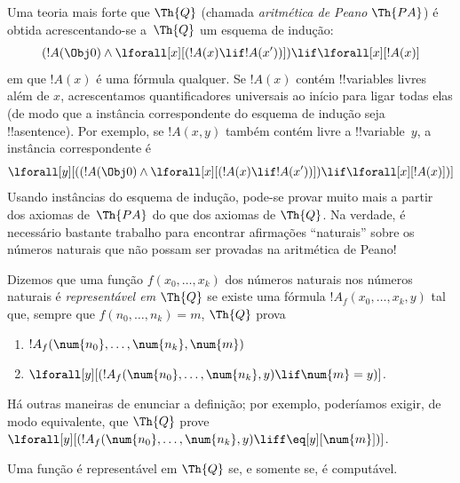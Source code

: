 \documentclass[../../../include/open-logic-section]{subfiles}
\begin{document}
Uma teoria mais forte que $\Th{Q}$ (chamada \emph{aritmética de Peano}
$\Th{PA}$) é obtida acrescentando-se a~$\Th{Q}$ um esquema de indução:
\[
(!A(\Obj 0) \land \lforall[x][(!A(x) \lif !A(x'))]) \lif \lforall[x][!A(x)]
\]
em que $!A(x)$ é uma fórmula qualquer. Se $!A(x)$ contém
!!{variable}s livres além de $x$, acrescentamos quantificadores
universais ao início para ligar todas elas (de modo que a instância
correspondente do esquema de indução seja !!a{sentence}). Por exemplo,
se $!A(x, y)$ também contém livre a !!{variable}~$y$, a instância
correspondente é
\[
\lforall[y][((!A(\Obj 0) \land \lforall[x][(!A(x) \lif !A(x'))]) \lif
  \lforall[x][!A(x)])]
\]
Usando instâncias do esquema de indução, pode-se provar muito mais a
partir dos axiomas de~$\Th{PA}$ do que dos axiomas de $\Th{Q}$. Na
verdade, é necessário bastante trabalho para encontrar afirmações
``naturais'' sobre os números naturais que não possam ser provadas na
aritmética de Peano!{}

\begin{defn}
  Dizemos que uma função $f(x_0,\ldots,x_k)$ dos números naturais nos
  números naturais é {\em representável em $\Th{Q}$} se existe uma
  fórmula $!A_f(x_0,\dots,x_k,y)$ tal que, sempre que
  $f(n_0,\dots,n_k) = m$, $\Th{Q}$ prova
\begin{enumerate}
\item{} $!A_f(\num{n_0}, \dots, \num{n_k}, \num{m})$
\item{} $\lforall[y][(!A_f(\num{n_0}, \dots,
\num{n_k}, y) \lif \num{m} = y)]$.
\end{enumerate}
\end{defn}

Há outras maneiras de enunciar a definição; por exemplo, poderíamos
exigir, de modo equivalente, que $\Th{Q}$ prove
$\lforall[y][(!A_f(\num{n_0}, \dots,
\num{n_k}, y) \liff \eq[y][\num{m}])]$.

\begin{thm}
Uma função é representável em $\Th{Q}$ se, e somente se, é computável.
\end{thm}
\end{document}

